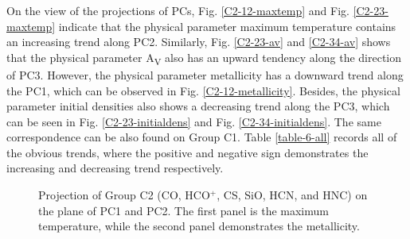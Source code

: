 \documentclass{aa}
\begin{document}
\begin{CJK*}{UTF8}{gbsn}
   On the view of the projections of PCs, Fig. \ref{C2-12-maxtemp} and Fig. \ref{C2-23-maxtemp} indicate that the physical parameter maximum temperature contains an increasing trend along PC2. 
   Similarly, Fig. \ref{C2-23-av} and \ref{C2-34-av} shows that the physical parameter A\textsubscript{V} also has an upward tendency along the direction of PC3. 
   However, the physical parameter metallicity has a downward trend along the PC1, which can be observed in Fig. \ref{C2-12-metallicity}. Besides, the physical parameter initial densities also shows a decreasing trend along the PC3, which can be seen in Fig. \ref{C2-23-initialdens} and Fig. \ref{C2-34-initialdens}. 
   The same correspondence can be also found on Group C1. 
   Table \ref{table-6-all} records all of the obvious trends, where the positive and negative sign demonstrates the increasing and decreasing trend respectively. 
   
\begin{figure}[htbp]
\centering
{}
\caption{Projection of Group C2 (CO, HCO$^+$, CS, SiO, HCN, and HNC) on the plane of PC1 and PC2. The first panel is the maximum temperature, while the second panel demonstrates the metallicity.}
\label{C2-12}
\end{figure}


\end{CJK*}
\end{document}

